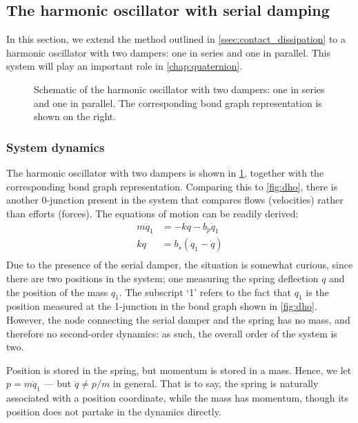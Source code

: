\subsection{The harmonic oscillator with serial damping}
\label{ssec:serial_damping}
In this section, we extend the method outlined in \cref{ssec:contact_dissipation} to a harmonic oscillator with two dampers: one in series and one in parallel. This system will play an important role in \cref{chap:quaternion}.
\begin{figure}[ht!]
    \centering
    
    \caption{Schematic of the harmonic oscillator with two dampers: one in series and one in parallel. The corresponding bond graph representation is shown on the right.}
    \label{fig:double_damped_osc}
\end{figure}

\subsubsection{System dynamics}
The harmonic oscillator with two dampers is shown in \cref{fig:double_damped_osc}, together with the corresponding bond graph representation. Comparing this to \cref{fig:dho}, there is another 0-junction present in the system that compares flows (velocities) rather than efforts (forces). The equations of motion can be readily derived:
\begin{equation}
    \begin{split}
        m\ddot{q}_1 &= -kq - b_p \dot{q}_1 \\
        kq &= b_s(\dot{q}_1 - \dot{q}) \\
    \end{split}
    \label{eq:serial_eom_raw}
\end{equation}
Due to the presence of the serial damper, the situation is somewhat curious, since there are two positions in the system; one measuring the spring deflection \(q\) and the position of the mass \(q_1\). The subscript `1' refers to the fact that \(q_1\) is the position measured at the 1-junction in the bond graph shown in \cref{fig:dho}. However, the node connecting the serial damper and the spring has no mass, and therefore no second-order dynamics: as such, the overall order of the system is two. 

Position is stored in the spring, but momentum is stored in a mass.
Hence, we let \(p = m\dot{q}_1\) --- but \(\dot{q} \neq p/m\) in general. That is to say, the spring is naturally associated with a position coordinate, while the mass has momentum, though its position does not partake in the dynamics directly.

